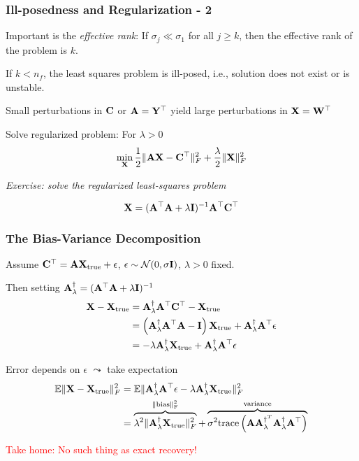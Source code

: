 \documentclass[12pt,fleqn,beamer]{beamer}
\begin{document}
\begin{frame}\frametitle{Ill-posedness and Regularization - 2}

Important is the \emph{effective rank}: If $\sigma_j \ll \sigma_1$ for all
$j\geq k$, then the effective rank of the problem is $k$.

\bigskip

If $k < n_f$, the least squares problem is ill-posed, i.e., solution does not exist or is unstable.

Small perturbations
in ${\bf C}$ or ${\bf A}={\bf Y}^\top$ yield large perturbations in ${\bf X} = {\bf W}^\top$

\bigskip

Solve regularized problem: For $\lambda>0$
$$ \min_{\bf X} {\frac 12} \|{\bf A}{\bf X} - {\bf C}^\top\|_F^2 + {\frac {\lambda}2} \|{\bf X}\|_F^2 $$

{
{\em Exercise: solve the regularized least-squares problem}
}
\pause


$$ {\bf X} = ({\bf A}^{\top} {\bf A} + \lambda {\bf I})^{-1} {\bf A}^{\top} {\bf C}^\top $$
\end{frame}

\begin{frame}\frametitle{The Bias-Variance Decomposition}

Assume ${\bf C}^\top = {\bf A} {\bf X}_{\rm true}  + \epsilon$, $\epsilon \sim\mathcal{N}(0,\sigma {\bf I})$,  $\lambda>0$ fixed.

Then setting  ${\bf A}^{\dag}_{\lambda} = ({\bf A}^{\top} {\bf A} + \lambda {\bf I})^{-1}$
\begin{align*}
	{\bf X} - {\bf X}_{\rm true} & = {\bf A}^{\dag}_{\lambda} {\bf A}^{\top} {\bf C}^\top - {\bf X}_{\rm true} \\
	                      & = \left({\bf A}^{\dag}_{\lambda} {\bf A}^{\top} {\bf A} - {\bf I} \right)  {\bf X}_{\rm true} +
	{\bf A}^{\dag}_{\lambda} {\bf A}^{\top} \epsilon \\
	                     & = -\lambda {\bf A}^{\dag}_{\lambda}{\bf X}_{\rm true}+
	{\bf A}^{\dag}_{\lambda} {\bf A}^{\top} \epsilon
\end{align*}

\pause

Error depends on $\epsilon$ $\leadsto$ take expectation
\begin{align*}
 {\mathbb E} \|{\bf X} - {\bf X}_{\rm true}\|_F^2 &= {\mathbb E}
\|{\bf A}^{\dag}_{\lambda} {\bf A}^{\top} \epsilon -\lambda {\bf A}^{\dag}_{\lambda}{\bf X}_{\rm true} \|_F^2   \\
&=\overbrace{ \lambda^2 \|{\bf A}^{\dag}_{\lambda}{\bf X}_{\rm true}\|_F^2}^{\rm \|bias\|_F^2} +
\overbrace{\sigma^2 {\rm trace}\left( {\bf A} {\bf A}^{\dag^T}_{\lambda} {\bf A}^{\dag}_{\lambda} {\bf A}^{\top} \right)}^{\rm variance}
\end{align*}

\pause
\begin{center}
	\textcolor{red}{Take home: No such thing as exact recovery!}	
\end{center}


\end{frame}
\end{document}
